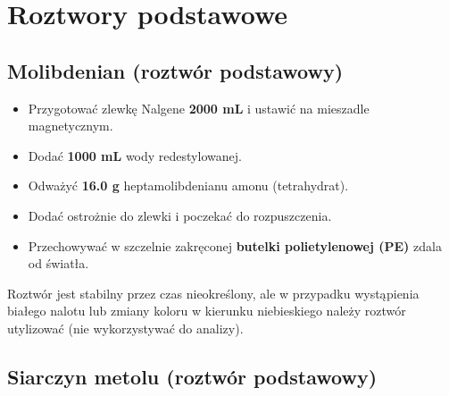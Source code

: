 \documentclass[
  letterpaper,
  DIV=11,
  numbers=noendperiod]{scrreprt}
\providecommand{\tightlist}{%
  \setlength{\itemsep}{0pt}\setlength{\parskip}{0pt}}\usepackage{longtable,booktabs,array}
\begin{document}
\hypertarget{roztwory-podstawowe}{%
\section{Roztwory podstawowe}\label{roztwory-podstawowe}}

\hypertarget{molibdenian-roztwuxf3r-podstawowy}{%
\subsection{Molibdenian (roztwór
podstawowy)}\label{molibdenian-roztwuxf3r-podstawowy}}

\begin{itemize}
\tightlist
\item
  Przygotować zlewkę Nalgene \textbf{2000 mL} i ustawić na mieszadle
  magnetycznym.
\item
  Dodać \textbf{1000 mL} wody redestylowanej.
\item
  Odważyć \textbf{16.0 g} heptamolibdenianu amonu (tetrahydrat).
\item
  Dodać ostrożnie do zlewki i poczekać do rozpuszczenia.
\item
  Przechowywać w szczelnie zakręconej \textbf{butelki polietylenowej
  (PE)} zdala od światła.
\end{itemize}

\begin{tcolorbox}[enhanced jigsaw, toptitle=1mm, bottomtitle=1mm, opacitybacktitle=0.6, colframe=quarto-callout-important-color-frame, bottomrule=.15mm, title=\textcolor{quarto-callout-important-color}{\faExclamation}\hspace{0.5em}{Uwaga}, colbacktitle=quarto-callout-important-color!10!white, left=2mm, breakable, rightrule=.15mm, colback=white, opacityback=0, arc=.35mm, coltitle=black, leftrule=.75mm, toprule=.15mm, titlerule=0mm]

Roztwór jest stabilny przez czas nieokreślony, ale w przypadku
wystąpienia białego nalotu lub zmiany koloru w kierunku niebieskiego
należy roztwór utylizować (nie wykorzystywać do analizy).

\end{tcolorbox}

\hypertarget{siarczyn-metolu-roztwuxf3r-podstawowy}{%
\subsection{Siarczyn metolu (roztwór
podstawowy)}\label{siarczyn-metolu-roztwuxf3r-podstawowy}}
\end{document}
